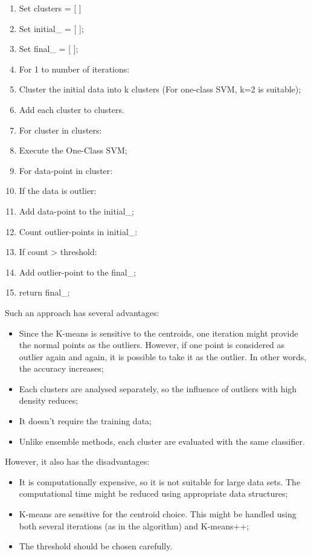 \documentclass[paper=8.27in:11.69in, 11pt]{scrartcl}
\begin{document}
\begin{enumerate}
\item Set clusters = [ ]
\item Set initial\_ = [ ];
\item Set final\_ = [ ];
\item For 1 to number of iterations:
\item \quad Cluster the initial data into k clusters (For one-class SVM, k=2 is suitable);
\item \quad Add each cluster to clusters.
\item For cluster in clusters:
\item \quad Execute the One-Class SVM;
\item \quad For data-point in cluster:
\item \quad\quad If the data is outlier:
\item \quad\quad\quad Add data-point to the initial\_;
\item Count outlier-points in initial\_:
\item \quad If count > threshold:
\item \quad\quad Add outlier-point to the final\_;
\item return final\_;

\end{enumerate}

Such an approach has several advantages:

\begin{itemize}
\item Since the K-means is sensitive to the centroids, one iteration might provide the normal points as the outliers. However, if one point is considered as outlier again and again, it is possible to take it as the outlier. In other words, the accuracy increases;
\item Each clusters are analysed separately, so the influence of outliers with high density reduces;
\item It doesn't require the training data;
\item Unlike ensemble methods, each cluster are evaluated with the same classifier.

\end{itemize}

However, it also has the disadvantages:

\begin{itemize}
\item It is computationally expensive, so it is not suitable for large data sets. The computational time might be reduced using appropriate data structures;
\item K-means are sensitive for the centroid choice. This might be handled using both several iterations (as in the algorithm) and K-means++;
\item The threshold should be chosen carefully.

\end{itemize}




\end{document}
